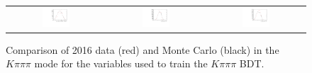 \begin{figure}
\begin{tabular}{ccc}
\includegraphics[width=0.3\textwidth]{ANA_resources/Plots/Monte_carlo/data_vs_MC/Kpipipi/log10(KstarPi_IPCHI2_OWNPV)_2016.pdf} & \includegraphics[width=0.3\textwidth]{ANA_resources/Plots/Monte_carlo/data_vs_MC/Kpipipi/log10(KstarK_PT)_2016.pdf} & \includegraphics[width=0.3\textwidth]{ANA_resources/Plots/Monte_carlo/data_vs_MC/Kpipipi/log10(KstarPi_PT)_2016.pdf} \\
\end{tabular}
\caption{Comparison of 2016 data (red) and Monte Carlo (black) in the $K\pi\pi\pi$ mode for the variables used to train the $K\pi\pi\pi$ BDT.}
\label{fig:data_vs_MC_Kpipipi_2016}
\end{figure}
